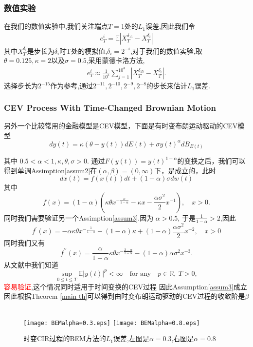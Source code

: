 \documentclass[12pt,final]{article}
\numberwithin{equation}{section}
\numberwithin{figure}{section}
\numberwithin{table}{section}
\theoremstyle{plain}
\theoremstyle{definition}
\theoremstyle{remark}
\begin{document}
	\subsubsection{数值实验}
	在我们的数值实验中,我们关注端点$T = 1$处的$L_1$误差,因此我们令
	\begin{align*}
		e_T^{i}=\mathbb{E}\left|X_T^{\delta _{15}}-X_T^{\delta _i}\right|
	\end{align*}
	其中$X_T^{\delta _i}$是步长为$\delta _i$时T处的模拟值,$\delta _i = 2^{-i}$,对于我们的数值实验,取$\theta=0.125,\kappa=2$以及$\sigma=0.5$,采用蒙德卡洛方法,
	\begin{align*}
		e_{T}^i\approx\frac{1}{10^3}\sum_{j=1}^{10^3}\left|X_T^{\delta _{15}}-X_T^{\delta _i}\right|.
	\end{align*}
	选择步长为$2^{-15}$作为参考,通过${2^{-11},2^{-10},2^{-9},2^{-8}}$的步长来估计$L_1$误差.
	\subsubsection{CEV Process With Time-Changed Brownian Motion}
	另外一个比较常用的金融模型是CEV模型，下面是有时变布朗运动驱动的CEV模型
	$$dy(t)=\kappa(\theta-y(t))dE(t)+\sigma y(t)^\alpha dB_{E(t)}$$
	
	其中 $0.5<\alpha<1,\kappa,\theta,\sigma>0.$ 通过$F(y(t))=y(t)^{1-\alpha}$的变换之后，我们可以得到单调Assimption\ref{assum2}在$(\alpha,\beta)=(0,\infty)$下，是成立的，此时	$$dx(t)=f(x(t))dt+(1-\alpha)\sigma dw(t)$$
	其中
	$$f(x)=(1-\alpha)\left(\kappa\theta x^{-\frac\alpha{1-\alpha}}-\kappa x-\frac{\alpha\sigma^2}2x^{-1}\right),\quad x>0.$$
	同时我们需要验证另一个Assimption\ref{assum3}.因为 $\alpha>0.5$, 于是$\frac{1}{1-\alpha}>2$,因此
	$$f^{\prime}(x)=-\alpha\kappa\theta x^{-\frac1{1-\alpha}}-(1-\alpha)\kappa+(1-\alpha)\frac{\alpha\sigma^2}2x^{-2},\quad x>0$$
	同时我们又有
	$$f^{\prime\prime}(x)=\frac\alpha{1-\alpha}\kappa\theta x^{-\frac{2-\alpha}{1-\alpha}}-(1-\alpha)\alpha\sigma^2x^{-3}.$$
	从文献\cite{berkaoui2008euler}中我们知道
	$$\sup\limits_{0\leq t\leq T}\mathbb{E}\left|y(t)\right|^p<\infty\quad\text{for any}\quad p\in\mathbb{R},\:T>0,$$
	\textcolor{red}{容易验证},这个情况同时适用于时间变换的CEV过程
	因此Assumption\ref{assum3}成立 因此根据Theorem \ref{main th}可以得到由时变布朗运动驱动的CEV过程的收敛阶是$\beta$
	\
	
	\begin{figure}[htp!]
		\centering
		\texttt{[image: BEMalpha=0.3.eps]}
		\hfill
		\texttt{[image: BEMalpha=0.8.eps]}
		\caption{时变CIR过程的BEM方法的$L_1$误差,左图是$\alpha=0.3$,右图是$\alpha=0.8$}
		\label{fig:image}
		\vspace{-2ex}
	\end{figure}
	
\end{document}

